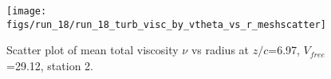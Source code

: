 \begin{figure}[H]
\centering
\texttt{[image: figs/run\_18/run\_18\_turb\_visc\_by\_vtheta\_vs\_r\_meshscatter]}
\caption{Scatter plot of mean total viscosity $\nu$ vs radius at $z/c$=6.97, $V_{free}$=29.12, station 2.}
\label{fig:run_18_turb_visc_by_vtheta_vs_r_meshscatter}
\end{figure}


